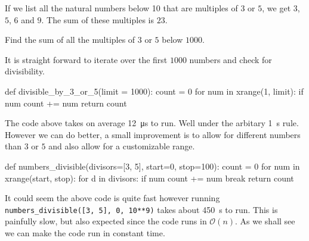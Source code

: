 \begin{ProjectEuler}{1}

If we list all the natural numbers below 10 that are multiples of $3$ or $5$, we get $3$, $5$, $6$ and $9$. The sum of these multiples is $23$.
\medskip

\noindent Find the sum of all the multiples of $3$ or $5$ below $1000$.

\end{ProjectEuler}

It is straight forward to iterate over the first $1000$ numbers and check for divisibility.

\begin{pythoncode}
	def divisible_by_3_or_5(limit = 1000):
	    count = 0
	    for num in xrange(1, limit):
	        if num%
	            count += num
	    return count
\end{pythoncode}
%
The code above takes on average \SI{12}{\micro\s} to run. Well under the arbitary \SI{1}{\s} rule. However we can do better, a small improvement
is to allow for different numbers than $3$ or $5$ and also allow for a customizable range. 
%
\begin{pythoncode}
	def numbers_divisible(divisors=[3, 5], start=0, stop=100):
	    count = 0
	    for num in xrange(start, stop):
	        for d in divisors:
	            if num %
	                count += num
	                break
	    return count
\end{pythoncode}
%
It could seem the above code is quite fast however running \verb|numbers_divisible([3, 5], 0, 10**9)| takes about \SI{450}{\s} to run. 
This is painfully slow, but also expected since the code runs in $\mathcal{O}(n)$. As we shall see we can make the code run in constant time. 
%

